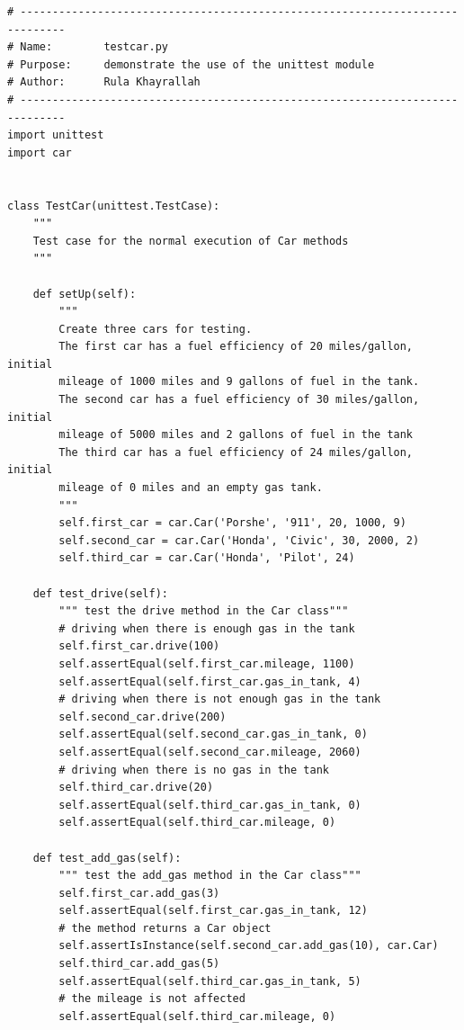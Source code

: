 \documentclass{article}
\begin{document}
\begin{lstlisting}
# -----------------------------------------------------------------------------
# Name:        testcar.py
# Purpose:     demonstrate the use of the unittest module
# Author:      Rula Khayrallah
# -----------------------------------------------------------------------------
import unittest
import car


class TestCar(unittest.TestCase):
    """
    Test case for the normal execution of Car methods
    """

    def setUp(self):
        """
        Create three cars for testing.
        The first car has a fuel efficiency of 20 miles/gallon, initial
        mileage of 1000 miles and 9 gallons of fuel in the tank.
        The second car has a fuel efficiency of 30 miles/gallon, initial
        mileage of 5000 miles and 2 gallons of fuel in the tank
        The third car has a fuel efficiency of 24 miles/gallon, initial
        mileage of 0 miles and an empty gas tank.
        """
        self.first_car = car.Car('Porshe', '911', 20, 1000, 9)
        self.second_car = car.Car('Honda', 'Civic', 30, 2000, 2)
        self.third_car = car.Car('Honda', 'Pilot', 24)

    def test_drive(self):
        """ test the drive method in the Car class"""
        # driving when there is enough gas in the tank
        self.first_car.drive(100)
        self.assertEqual(self.first_car.mileage, 1100)
        self.assertEqual(self.first_car.gas_in_tank, 4)
        # driving when there is not enough gas in the tank
        self.second_car.drive(200)
        self.assertEqual(self.second_car.gas_in_tank, 0)
        self.assertEqual(self.second_car.mileage, 2060)
        # driving when there is no gas in the tank
        self.third_car.drive(20)
        self.assertEqual(self.third_car.gas_in_tank, 0)
        self.assertEqual(self.third_car.mileage, 0)

    def test_add_gas(self):
        """ test the add_gas method in the Car class"""
        self.first_car.add_gas(3)
        self.assertEqual(self.first_car.gas_in_tank, 12)
        # the method returns a Car object
        self.assertIsInstance(self.second_car.add_gas(10), car.Car)
        self.third_car.add_gas(5)
        self.assertEqual(self.third_car.gas_in_tank, 5)
        # the mileage is not affected
        self.assertEqual(self.third_car.mileage, 0)
\end{lstlisting}
 
\end{document}
